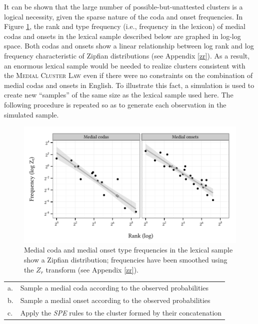 It can be shown that the large number of possible-but-unattested clusters is a logical necessity, given the sparse nature of the coda and onset frequencies. 
In Figure \ref{cao}, the rank and type frequency (i.e., frequency in the lexicon) of medial codas and onsets in the lexical sample described below are graphed in log-log space. 
Both codas and onsets show a linear relationship between log rank and log frequency characteristic of Zipfian distributions (see Appendix \ref{zr}). 
As a result, an enormous lexical sample would be needed to realize clusters consistent with the \textsc{Medial Cluster Law} even if there were no constraints on the combination of medial codas and onsets in English.
To illustrate this fact, a simulation is used to create new ``samples'' of the same size as the lexical sample used here. The following procedure is repeated so as to generate each observation in the simulated sample.

\begin{figure}
\centering
\includegraphics{co.pdf}
\caption{Medial coda and medial onset type frequencies in the lexical sample show a Zipfian distribution; frequencies have been smoothed using the $Z_r$ transform (see Appendix \ref{zr}).}
\label{cao}
\end{figure}

\begin{example}
\begin{tabular}{l l}
a. & Sample a medial coda according to the observed probabilities  \\
b. & Sample a medial onset according to the observed probabilities \\
c. & Apply the \emph{SPE} rules to the cluster formed by their concatenation \\
\end{tabular}
\end{example}

